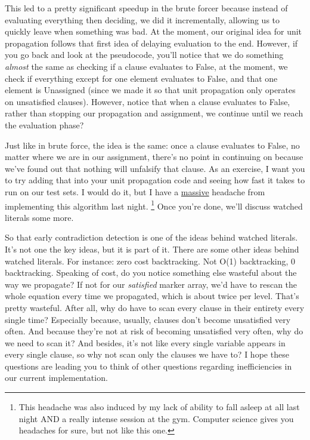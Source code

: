 \documentclass[../main.tex]{subfiles}
\begin{document}
This led to a pretty significant speedup in the brute forcer because instead of evaluating everything 
then deciding, we did it incrementally, allowing us to quickly leave when something was bad. 
At the moment, our original idea for unit propagation follows that first idea of delaying 
evaluation to the end. However, if you go back and look at the pseudocode, you'll notice that we 
do something \textit{almost} the same as checking if a clause evaluates to False, at the moment,
we check if everything except for one element evaluates to False, and that one element is Unassigned
(since we made it so that unit propagation only operates on unsatisfied clauses). However, notice 
that when a clause evaluates to False, rather than stopping our propagation and assignment, we 
continue until we reach the evaluation phase? 

Just like in brute force, the idea is the same: once a clause evaluates to False, no matter 
where we are in our assignment, there's no point in continuing on because we've found out that 
nothing will unfalsify that clause. As an exercise, I want you to try adding that into your 
unit propagation code and seeing how fast it takes to run on our test sets. I would do it, but 
I have a \underline{massive} headache from implementing this algorithm last night.
\footnote{This headache was also induced by my lack of ability to fall asleep at all last night
AND a really intense session at the gym. Computer science gives you headaches for sure, but not like 
this one.}
Once you're done, we'll discuss watched literals some more.

So that early contradiction detection is one of the ideas behind watched literals. 
It's not one the key ideas, but it is part of it. There are some other ideas behind 
watched literals. For instance: zero cost backtracking. Not O(1) backtracking, $0$
backtracking. Speaking of cost, do you notice something else wasteful about the 
way we propagate? If not for our \textit{satisfied} marker array, we'd have to 
rescan the whole equation every time we propagated, which is about twice per level. 
That's pretty wasteful. After all, why do have to scan every clause in their entirety
every single time? Especially because, usually, clauses don't become unsatisfied very 
often. And because they're not at risk of becoming unsatisfied very often, why do we need 
to scan it? And besides, it's not like every single variable appears in every single 
clause, so why not scan only the clauses we have to? I hope these questions are leading 
you to think of other questions regarding inefficiencies in our current implementation.
\end{document}
